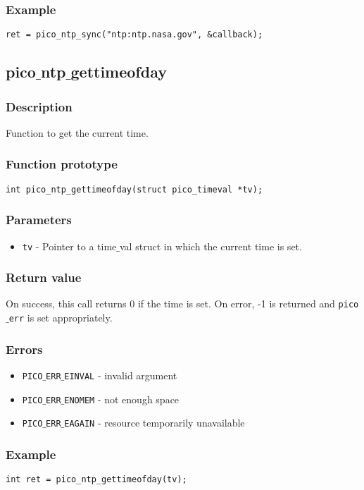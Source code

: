 \subsubsection*{Example}
\begin{verbatim}
ret = pico_ntp_sync("ntp:ntp.nasa.gov", &callback);
\end{verbatim}



\subsection{pico$\_$ntp$\_$gettimeofday}

\subsubsection*{Description}
Function to get the current time.

\subsubsection*{Function prototype}
\begin{verbatim}
int pico_ntp_gettimeofday(struct pico_timeval *tv);
\end{verbatim}

\subsubsection*{Parameters}
\begin{itemize}[noitemsep]
\item \texttt{tv} - Pointer to a time$\_$val struct in which the current time is set.
\end{itemize}

\subsubsection*{Return value}
On success, this call returns 0 if the time is set.
On error, -1 is returned and \texttt{pico$\_$err} is set appropriately.

\subsubsection*{Errors}
\begin{itemize}[noitemsep]
\item \texttt{PICO$\_$ERR$\_$EINVAL} - invalid argument
\item \texttt{PICO$\_$ERR$\_$ENOMEM} - not enough space
\item \texttt{PICO$\_$ERR$\_$EAGAIN} - resource temporarily unavailable
\end{itemize}

\subsubsection*{Example}
\begin{verbatim}
int ret = pico_ntp_gettimeofday(tv);
\end{verbatim}



